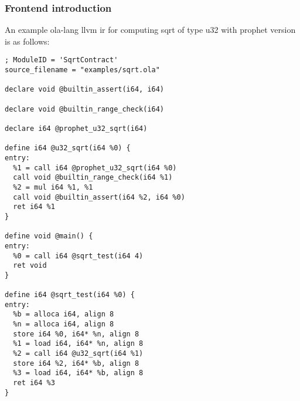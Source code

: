\subsubsection{Frontend introduction}

An example ola-lang llvm ir for computing sqrt of type u32 with prophet version is as follows:
\begin{lstlisting}[language={}]
; ModuleID = 'SqrtContract'
source_filename = "examples/sqrt.ola"

declare void @builtin_assert(i64, i64)

declare void @builtin_range_check(i64)

declare i64 @prophet_u32_sqrt(i64)

define i64 @u32_sqrt(i64 %0) {
entry:
  %1 = call i64 @prophet_u32_sqrt(i64 %0)
  call void @builtin_range_check(i64 %1)
  %2 = mul i64 %1, %1
  call void @builtin_assert(i64 %2, i64 %0)
  ret i64 %1
}

define void @main() {
entry:
  %0 = call i64 @sqrt_test(i64 4)
  ret void
}

define i64 @sqrt_test(i64 %0) {
entry:
  %b = alloca i64, align 8
  %n = alloca i64, align 8
  store i64 %0, i64* %n, align 8
  %1 = load i64, i64* %n, align 8
  %2 = call i64 @u32_sqrt(i64 %1)
  store i64 %2, i64* %b, align 8
  %3 = load i64, i64* %b, align 8
  ret i64 %3
}
\end{lstlisting}

